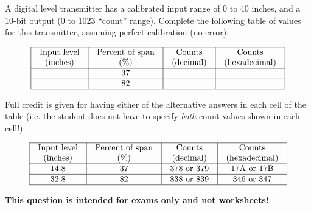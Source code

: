 

A digital level transmitter has a calibrated input range of 0 to 40 inches, and a 10-bit output (0 to 1023 ``count'' range).  Complete the following table of values for this transmitter, assuming perfect calibration (no error):


$$\vbox{\offinterlineskip
\halign{\strut
\vrule \quad\hfil # \ \hfil & 
\vrule \quad\hfil # \ \hfil & 
\vrule \quad\hfil # \ \hfil & 
\vrule \quad\hfil # \ \hfil \vrule \cr
\noalign{\hrule}
%
Input level & Percent of span & Counts & Counts \cr
%
(inches) & (\%) & (decimal) & (hexadecimal) \cr
%
\noalign{\hrule}
%
 & 37 &  &  \cr
%
\noalign{\hrule}
%
 & 82 &  &  \cr
%
\noalign{\hrule}
} %
}$$ %







Full credit is given for having either of the alternative answers in each cell of the table (i.e. the student does not have to specify {\it both} count values shown in each cell!):


$$\vbox{\offinterlineskip
\halign{\strut
\vrule \quad\hfil # \ \hfil & 
\vrule \quad\hfil # \ \hfil & 
\vrule \quad\hfil # \ \hfil & 
\vrule \quad\hfil # \ \hfil \vrule \cr
\noalign{\hrule}
%
Input level & Percent of span & Counts & Counts \cr
%
(inches) & (\%) & (decimal) & (hexadecimal) \cr
%
\noalign{\hrule}
%
14.8 & 37 & 378 or 379 & 17A or 17B \cr
%
\noalign{\hrule}
%
32.8 & 82 & 838 or 839 & 346 or 347 \cr
%
\noalign{\hrule}
} %
}$$ %







{\bf This question is intended for exams only and not worksheets!}.



